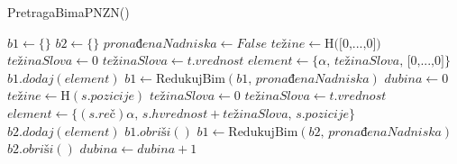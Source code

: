 \documentclass[12pt,oneside]{memoir}
\begin{document}
\begin{algorithm}
  \caption{\textrm{PretragaBimaPNZN()}}
  \label{alg:bs}
  \begin{algorithmic}[1]
  \State $b1 \gets \{ \}$
  \State $b2 \gets \{ \}$
  \State $prona\textrm{đ}enaNadniska \gets False$
  \State
  \State $te\textrm{ž}ine \gets \textrm{H}\textrm{([0,...,0])}$
  \State
  \For{$\alpha\in\Sigma$}
    \State $te\textrm{ž}inaSlova \gets 0$
        \State $te\textrm{ž}inaSlova \gets t\textrm{.}vrednost$
      \EndIf
    \EndFor
    \State $element \gets \{\alpha\textrm{, }te\textrm{ž}inaSlova \textrm{, [0,...,0]}\}$
    \State $b1\textrm{.}dodaj(element)$
  \EndFor
  \State
  \State $b1 \gets \textrm{RedukujBim}(b1\textrm{, }prona\textrm{đ}enaNadniska)$
  \State $dubina \gets 0$
  \State
      \State $te\textrm{ž}ine \gets \textrm{H}(s.pozicije)$
      \For{$\alpha\in\Sigma$}
        \State $te\textrm{ž}inaSlova \gets 0$
            \State $te\textrm{ž}inaSlova \gets t.vrednost$
          \EndIf
        \EndFor
      \State $element \gets \{(s.re\textrm{č})\alpha\textrm{, }s.hvrednost + te\textrm{ž}inaSlova\textrm{, }s.pozicije\}$
      \State $b2\textrm{.}dodaj(element)$
      \EndFor
    \EndFor
    \State
    \State $b1\textrm{.}obri\textrm{š}i()$
    \State $b1 \gets \textrm{RedukujBim}(b2\textrm{, }prona\textrm{đ}enaNadniska)$
    \State $b2\textrm{.}obri\textrm{š}i()$
    \State $dubina \gets dubina + 1$
  \EndWhile
  \end{algorithmic}
  \end{algorithm}
\\
\\
\\
\end{document}
